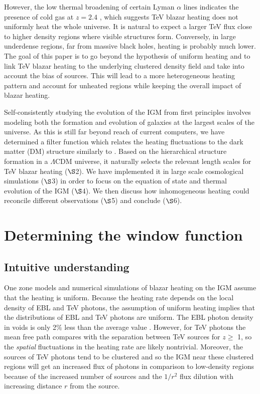 \documentclass[numberedappendix]{emulateapj}
\begin{document}
However, the low thermal broadening of certain Lyman $\alpha$ lines indicates the presence of cold gas at $z =2.4$ \citep{2012ApJ...757L..30R}, which suggests TeV blazar heating does not uniformly heat the whole universe. It is natural to expect a larger TeV flux close to higher density regions where visible structures form. Conversely, in large underdense regions, far from massive black holes, heating is probably much lower. The goal of this paper is to go beyond the hypothesis of uniform heating and to link TeV blazar heating to the underlying clustered density field and take into account the bias of sources. This will lead to a more heterogeneous heating pattern and account for unheated regions while keeping the overall impact of blazar heating.

Self-consistently studying the evolution of the IGM from first principles involves modeling both the formation and evolution of galaxies at the largest scales of the universe. As this is still far beyond reach of current computers, we have determined a filter function which relates the heating fluctuations to the dark matter (DM) structure similarly to \citet{2007MNRAS.376.1680P,2005ApJ...626....1B,2014PhRvD..89h3010P}. Based on the hierarchical structure formation in a $\Lambda$CDM universe, it naturally selects the relevant length scales for TeV blazar heating ($\S$2). We have implemented it in large scale cosmological simulations ($\S$3) in order to focus on the equation of state and thermal evolution of the IGM ($\S$4). We then discuss how inhomogeneous heating could reconcile different observations ($\S$5) and conclude ($\S$6).

\section {Determining the window function}\label{window}
\subsection{Intuitive understanding}
One zone models \citep{2012ApJ...752...23C,2012ApJ...752...24P} and numerical simulations \citep{2012MNRAS.423..149P} of blazar heating on the IGM assume that the heating is uniform. Because the heating rate depends on the local density of EBL and TeV photons, the assumption of uniform heating implies that the distributions of EBL and TeV photons are uniform. The EBL photon density in voids is only 2$\%$ less than the average value \citep{2015MNRAS.446.2267F}. However, for TeV photons the mean free path compares with the separation between TeV sources for $z\geqslant$ 1, so the {\it spatial} fluctuations in the heating rate are likely nontrivial. Moreover, the sources of TeV photons tend to be clustered and so the IGM near these clustered regions will get an increased flux of photons in comparison to low-density regions because of the increased number of sources and the $1/r^2$ flux dilution with increasing distance $r$ from the source.
\end{document}
